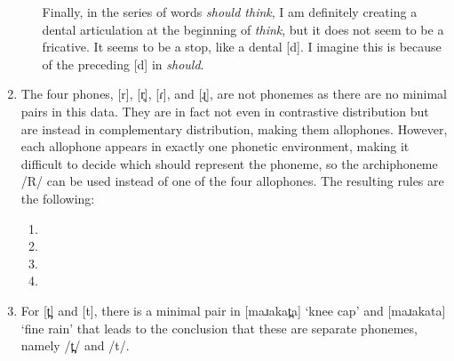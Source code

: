\documentclass{article}
\newcommand{\lexi}[1]{\textit{#1}}
\begin{document}
\begin{enumerate}
\begin{itemize}
      Finally, in the series of words \lexi{should think}, I am definitely creating a dental articulation at the beginning of \lexi{think}, but it does not seem to be a fricative.
      It seems to be a stop, like a dental [d].
      I imagine this is because of the preceding [d] in \lexi{should}.
    \end{itemize}
    \item The four phones, [r], [r̥], [ɾ], and [ɻ], are not phonemes as there are no minimal pairs in this data.
    They are in fact not even in contrastive distribution but are instead in complementary distribution, making them allophones.
    However, each allophone appears in exactly one phonetic environment, making it difficult to decide which should represent the phoneme, so the archiphoneme /R/ can be used instead of one of the four allophones.
    The resulting rules are the following:
    \begin{enumerate}
      \item {}
      \item {}
      \item {}
      \item {}
    \end{enumerate}
    \item For [t̪] and [t], there is a minimal pair in [maɹakat̪a] `knee cap' and [maɹakata] `fine rain' that leads to the conclusion that these are separate phonemes, namely /t̪/ and /t/.
  \end{enumerate}
\end{document}
